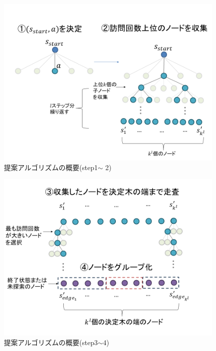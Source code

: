 \begin{figure}[t]
    \centering
    \includegraphics[width=\linewidth]{./figure/1-2.png}
    \caption{提案アルゴリズムの概要(step1$\sim$ 2)}
    \label{fig:step1-2}
\end{figure}
\begin{figure}[t]
    \centering
    \includegraphics[width=\linewidth]{./figure/3-4.png}
    \caption{提案アルゴリズムの概要(step3$\sim $4)}
    \label{fig:step3-4}
\end{figure}
